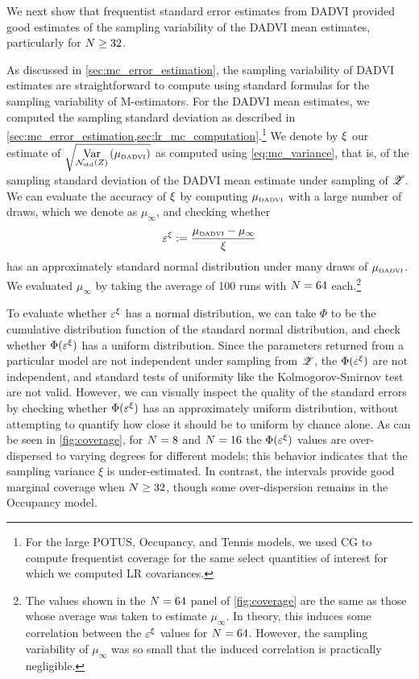 
\CoverageHistogram{}

We next show that frequentist standard error estimates from DADVI
provided good estimates of the sampling variability of the DADVI mean estimates, particularly
for $N \ge 32$.

As discussed in \cref{sec:mc_error_estimation}, the sampling variability of
DADVI estimates are straightforward to compute using standard formulas for the
sampling variability of M-estimators. For the DADVI mean estimates, we computed
the sampling standard deviation as described in
\cref{sec:mc_error_estimation,sec:lr_mc_computation}.\footnote{For the large
POTUS, Occupancy, and Tennis models, we used CG to compute frequentist coverage
for the same select quantities of interest for which we computed LR
covariances.} We denote by $\xi$ our estimate of
$\sqrt{\underset{\mathcal{N}_{\mathrm{std}}\left(Z\right)}{\mathrm{Var}}\left(\mu_{\textrm{\tiny DADVI}}\right)}$ as computed using \cref{eq:mc_variance}, that
is, of the sampling standard deviation of the DADVI mean estimate under sampling
of $\mathscr{Z}$.  We can evaluate the accuracy of $\xi$ by computing $\mu_{\textrm{\tiny DADVI}}$
with a large number of draws, which we denote as $\mu_\infty$, and checking
whether
%
\begin{align*}
%
\freqerr := \frac{\mu_\dadvi - \mu_\infty}{\freqsd}
%
\end{align*}
%
has an approximately standard normal distribution under many draws of
$\mu_{\textrm{\tiny DADVI}}$.  We evaluated $\mu_\infty$ by taking the average of 100 runs with
$N = 64$ each.\footnote{The values shown in the $N = 64$ panel of
\cref{fig:coverage} are the same as those whose average was taken to estimate
$\mu_\infty$.  In theory, this induces some correlation between the $\varepsilon^{\xi}$
values for $N = 64$.  However, the sampling variability of $\mu_\infty$ was
so small that the induced correlation is practically negligible.}

To evaluate whether $\varepsilon^{\xi}$ has a normal distribution, we can take  $\Phi$ to
be the cumulative distribution function of the standard normal distribution, and
check whether $\Phi(\varepsilon^{\xi})$ has a uniform distribution.  Since the parameters
returned from a particular model are not independent under sampling from $\mathscr{Z}$,
the $\Phi(\varepsilon^{\xi})$ are not independent, and standard tests of uniformity like
the Kolmogorov-Smirnov test are not valid.
%
However, we can visually inspect the quality of the standard errors by checking
whether $\Phi(\varepsilon^{\xi})$ has an approximately uniform distribution, without
attempting to quantify how close it should be to uniform by chance alone. As can
be seen in \cref{fig:coverage}, for $N = 8$ and $N = 16$ the
$\Phi(\varepsilon^{\xi})$ values are over-dispersed to varying degrees for different
models; this behavior indicates that the sampling variance $\xi$ is under-estimated. In
contrast, the intervals provide good marginal coverage when $N \ge 32$,
though some over-dispersion remains in the Occupancy model.
%

